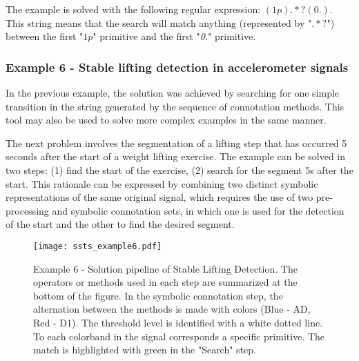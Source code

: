 \par
The example is solved with the following regular expression: $(1p).*?(0.)$. This string means that the search will match anything (represented by "$.*?$") between the first "$1p$" primitive and the first "\textit{0.}" primitive.

\subsubsection{Example 6 - Stable lifting detection in accelerometer signals}

In the previous example, the solution was achieved by searching for one simple transition in the string generated by the sequence of connotation methods. This tool may also be used to solve more complex examples in the same manner.

\par
The next problem involves the segmentation of a lifting step that has occurred 5 seconds after the start of a weight lifting exercise. The example can be solved in two steps: (1) find the start of the exercise, (2) search for the segment 5s after the start. This rationale can be expressed by combining two distinct symbolic representations of the same original signal, which requires the use of two pre-processing and symbolic connotation sets, in which one is used for the detection of the start and the other to find the desired segment.

\begin{figure}[H]
  \centering
      \texttt{[image: ssts\_example6.pdf]}
  \caption{Example 6 - Solution pipeline of Stable Lifting Detection. The operators or methods used in each step are summarized at the bottom of the figure. In the symbolic connotation step, the alternation between the methods is made with colors (Blue - AD, Red - D1). The threshold level is identified with a white dotted line. To each colorband in the signal corresponds a specific primitive. The match is highlighted with green in the "Search" step.}
  \label{fig:Hard}
\end{figure}

